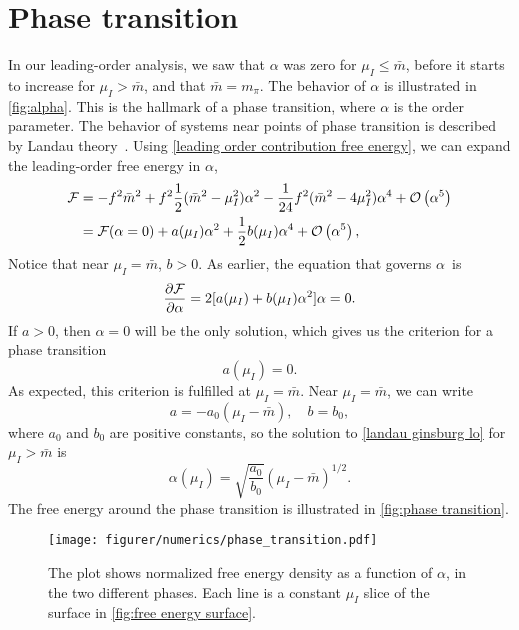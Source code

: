 \section{Phase transition}

In our leading-order analysis, we saw that $\alpha$ was zero for $\mu_I \leq \bar m$, before it starts to increase for $\mu_I>\bar m$, and that $\bar m = m_\pi$.
The behavior of $\alpha$ is illustrated in \autoref{fig:alpha}.
This is the hallmark of a phase transition, where $\alpha$ is the order parameter.
The behavior of systems near points of phase transition is described by Landau theory~\cite{Peskin:IntroQFT}.
Using \cref{leading order contribution free energy}, we can expand the leading-order free energy in $\alpha$,
\begin{align}
    \nonumber
    \Ef
    & = -f^2 \bar m^2 + f^2 \frac{1}{2}(\bar m^2 - \mu_I^2)\alpha^2
    - \frac{1}{24} f^2 (\bar m^2 - 4 \mu_I^2) \alpha^4 + \Oh[5]{\alpha} \\
    & = \Ef(\alpha=0) + a(\mu_I)\alpha^2 + \frac{1}{2} b(\mu_I)\alpha^4 + \Oh[5]{\alpha},
\end{align}
Notice that near $\mu_I = \bar m$, $b > 0$.
As earlier, the equation that governs $\alpha$ is
\begin{equation}
    \label{landau ginsburg lo}
    \diffp{\Ef}{\alpha} = 2 [a(\mu_I) + b(\mu_I) \alpha^2] \alpha = 0.
\end{equation}
If $a>0$, then $\alpha = 0$ will be the only solution, which gives us the criterion for a phase transition 
\begin{equation}
    a(\mu_I) = 0.
\end{equation}
As expected, this criterion is fulfilled at $\mu_I = \bar m$.
Near $\mu_I = \bar m$, we can write
\begin{equation}
    a = - a_0 (\mu_I - \bar m), \quad b = b_0,
\end{equation}
where $a_0$ and $b_0$ are positive constants, so the solution to \cref{landau ginsburg lo} for $\mu_I>\bar m$ is
\begin{equation}
    \alpha(\mu_I) = \sqrt{\frac{a_0}{b_0}} (\mu_I - \bar m)^{1/2}.
\end{equation}
The free energy around the phase transition is illustrated in \autoref{fig:phase transition}.
\begin{figure}[h]
    \centering
    \texttt{[image: figurer/numerics/phase\_transition.pdf]}
    \caption{The plot shows normalized free energy density as a function of $\alpha$, in the two different phases. Each line is a constant $\mu_I$ slice of the surface in \autoref{fig:free energy surface}.}
    \label{fig:phase transition}
\end{figure}

